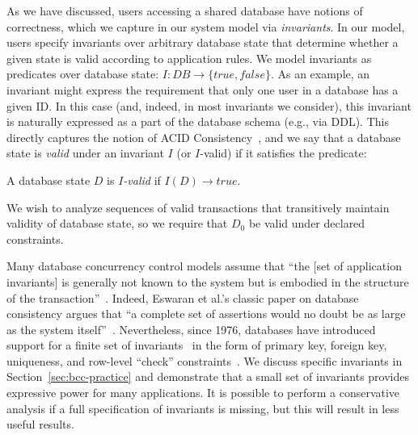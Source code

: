  As we have discussed, users accessing a shared
database have notions of correctness, which we capture in our system
model via \textit{invariants}. In our model, users specify invariants
over arbitrary database state that determine whether a given state is
valid according to application rules. We model invariants as
predicates over database state: $I: DB \rightarrow \{true, false\}$.  As
an example, an invariant might express the requirement that only one
user in a database has a given ID. In this case (and, indeed, in most
invariants we consider), this invariant is naturally expressed as a
part of the database schema (e.g., via DDL). This directly captures
the notion of ACID Consistency~\cite{bernstein-book,gray-virtues}, and
we say that a database state is \textit{valid} under an invariant $I$
(or $I$-valid) if it satisfies the predicate:

\begin{definition}
A database state $D$ is \textit{$I$-valid} if $I(D) \rightarrow true$.
\end{definition}

We wish to analyze sequences of valid transactions that transitively
maintain validity of database state, so we require that $D_0$ be valid
under declared constraints.

 Many database concurrency
control models assume that ``the [set of application invariants] is
generally not known to the system but is embodied in the structure of
the transaction''~\cite{traiger-tods}. Indeed, Eswaran et al.'s
classic paper on database consistency argues that ``a complete set of
assertions would no doubt be as large as the system
itself''~\cite{eswaran-consistency}. Nevertheless, since 1976,
databases have introduced support for a finite set of
invariants~\cite{korth-serializability,decomp-semantics,garciamolina-semantics,ic-survey,ic-survey-two}
in the form of primary key, foreign key, uniqueness, and row-level
``check'' constraints~\cite{kemme-si-ic}. We discuss specific
invariants in Section~\ref{sec:bcc-practice} and demonstrate that a
small set of invariants provides expressive power for many
applications. It is possible to perform a conservative analysis if a
full specification of invariants is missing, but this will result in
less useful results.\vspace{.5em}


